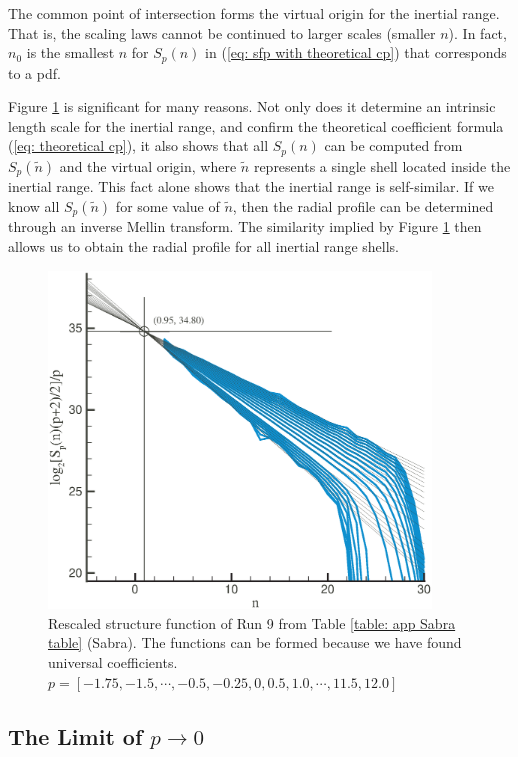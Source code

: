 The common point of intersection forms the virtual origin for the inertial range.  That is, the scaling laws cannot be continued to larger scales (smaller $n$). In fact, $n_0$ is the smallest $n$ for $S_{p}(n)$ in (\ref{eq: sfp with theoretical cp}) that corresponds to a pdf.

Figure \ref{fig: at focus} is significant for many reasons.  Not only does it determine an intrinsic length scale  for the inertial range, and confirm the theoretical coefficient formula (\ref{eq: theoretical cp}), it also shows that all $S_{p}(n)$ can be computed from $S_{p}(\tilde{n})$ and the virtual origin, where $\tilde{n}$ represents a single shell located inside the inertial range.  This fact alone shows that the inertial range is self-similar.  If we know all $S_{p}(\tilde{n})$ for some value of $\tilde{n}$, then the radial profile can be determined through an inverse Mellin transform. The similarity implied by Figure \ref{fig: at focus} then allows us to obtain the radial profile for all inertial range shells.

\begin{figure}[!hpt]
    \begin{center}
    \includegraphics[width=4in]{at_focus.eps}
    \end{center}
    \caption{Rescaled structure function of Run 9 from Table \ref{table: app Sabra table} (Sabra). The functions can be formed because we have found universal coefficients.  $p = [-1.75, -1.5, \cdots, -0.5, -0.25, 0, 0.5, 1.0, \cdots, 11.5, 12.0]$} \label{fig: at focus}
\end{figure}

\subsection{The Limit of $p \rightarrow 0$}

